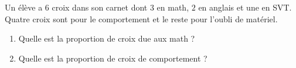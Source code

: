 
\begin{exercice}\label{exo2smath-0320}

    Un élève a \( 6\) croix dans son carnet dont \( 3\) en math, \( 2\) en anglais et une en SVT. Quatre croix sont pour le comportement et le reste pour l'oubli de matériel.
    \begin{enumerate}
        \item
            Quelle est la proportion de croix due aux math ?
        \item
            Quelle est la proportion de croix de comportement ?
    \end{enumerate}

\end{exercice}
